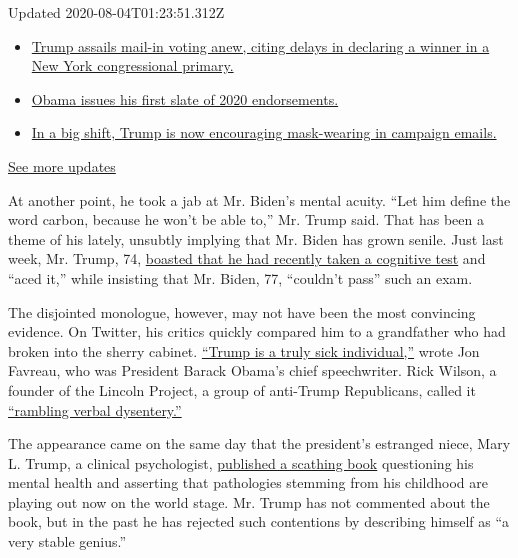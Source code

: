 Updated 2020-08-04T01:23:51.312Z

\begin{itemize}
\tightlist
\item
  \href{https://www.nytimes.com/2020/08/03/us/elections/biden-vs-trump.html?action=click\&pgtype=Article\&state=default\&region=MAIN_CONTENT_1\&context=storylines_live_updates\#link-6494b448}{Trump
  assails mail-in voting anew, citing delays in declaring a winner in a
  New York congressional primary.}
\item
  \href{https://www.nytimes.com/2020/08/03/us/elections/biden-vs-trump.html?action=click\&pgtype=Article\&state=default\&region=MAIN_CONTENT_1\&context=storylines_live_updates\#link-3de249e6}{Obama
  issues his first slate of 2020 endorsements.}
\item
  \href{https://www.nytimes.com/2020/08/03/us/elections/biden-vs-trump.html?action=click\&pgtype=Article\&state=default\&region=MAIN_CONTENT_1\&context=storylines_live_updates\#link-54e34d20}{In
  a big shift, Trump is now encouraging mask-wearing in campaign
  emails.}
\end{itemize}

\href{https://www.nytimes.com/2020/08/03/us/elections/biden-vs-trump.html?action=click\&pgtype=Article\&state=default\&region=MAIN_CONTENT_1\&context=storylines_live_updates}{See
more updates}

At another point, he took a jab at Mr. Biden's mental acuity. ``Let him
define the word carbon, because he won't be able to,'' Mr. Trump said.
That has been a theme of his lately, unsubtly implying that Mr. Biden
has grown senile. Just last week, Mr. Trump, 74,
\href{https://www.nytimes.com/2020/07/10/us/politics/trump-cognitive-test-health.html}{boasted
that he had recently taken a cognitive test} and ``aced it,'' while
insisting that Mr. Biden, 77, ``couldn't pass'' such an exam.

The disjointed monologue, however, may not have been the most convincing
evidence. On Twitter, his critics quickly compared him to a grandfather
who had broken into the sherry cabinet.
\href{https://twitter.com/jonfavs/status/1283157746603356160}{``Trump is
a truly sick individual,''} wrote Jon Favreau, who was President Barack
Obama's chief speechwriter. Rick Wilson, a founder of the Lincoln
Project, a group of anti-Trump Republicans, called it
\href{https://twitter.com/TheRickWilson/status/1283165162988621839}{``rambling
verbal dysentery.''}

The appearance came on the same day that the president's estranged
niece, Mary L. Trump, a clinical psychologist,
\href{https://www.nytimes.com/2020/07/08/books/review-too-much-never-enough-mary-trump.html}{published
a scathing book} questioning his mental health and asserting that
pathologies stemming from his childhood are playing out now on the world
stage. Mr. Trump has not commented about the book, but in the past he
has rejected such contentions by describing himself as ``a very stable
genius.''

